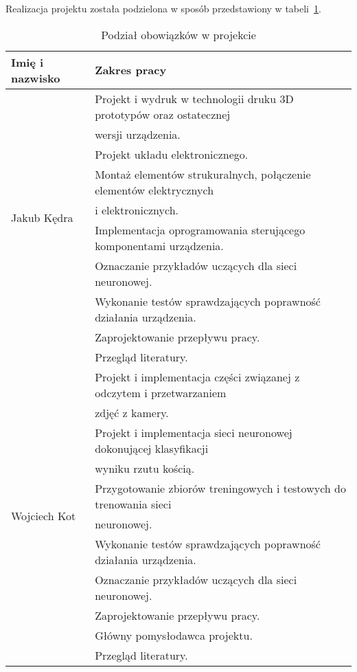 Realizacja projektu została podzielona w sposób przedstawiony w tabeli~\ref{tab:podzial}.
\begin{table} [h]
    \centering
    \caption{Podział obowiązków w projekcie}
    \label{tab:podzial}
    \begin{tabular}{|l|l|}
        \hline
        Imię i nazwisko & Zakres pracy \\
        \hline
        \multirow{9}{*}{Jakub Kędra} 
            & Projekt i wydruk w technologii druku 3D prototypów oraz ostatecznej \\
            & wersji urządzenia. \\
            & Projekt układu elektronicznego. \\
            & Montaż elementów strukuralnych, połączenie elementów elektrycznych \\
            & i elektronicznych. \\
            & Implementacja oprogramowania sterującego komponentami urządzenia. \\
            & Oznaczanie przykładów uczących dla sieci neuronowej. \\
            & Wykonanie testów sprawdzających poprawność działania urządzenia. \\
            & Zaprojektowanie przepływu pracy. \\
            & Przegląd literatury. \\
        \hline
        \multirow{11}{*}{Wojciech Kot} 
            & Projekt i implementacja części związanej z odczytem i przetwarzaniem \\
            & zdjęć z kamery. \\
            & Projekt i implementacja sieci neuronowej dokonującej klasyfikacji \\
            & wyniku rzutu kością. \\
            & Przygotowanie zbiorów treningowych i testowych do trenowania sieci \\
            & neuronowej. \\
            & Wykonanie testów sprawdzających poprawność działania urządzenia. \\
            & Oznaczanie przykładów uczących dla sieci neuronowej. \\
            & Zaprojektowanie przepływu pracy. \\
            & Główny pomysłodawca projektu. \\
            & Przegląd literatury. \\
        \hline

\end{tabular}
\end{table}
